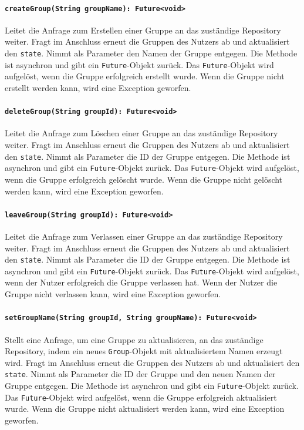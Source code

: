 \documentclass{entwurfsheft}
\begin{document}
\begin{sloppypar}
\paragraph{\texttt{createGroup(String groupName): Future<void>}}
Leitet die Anfrage zum Erstellen einer Gruppe an das zuständige Repository weiter. Fragt im Anschluss erneut die Gruppen des Nutzers ab und aktualisiert den \texttt{state}. Nimmt als Parameter den Namen der Gruppe entgegen. Die Methode ist asynchron und gibt ein \texttt{Future}-Objekt zurück. Das \texttt{Future}-Objekt wird aufgelöst, wenn die Gruppe erfolgreich erstellt wurde. Wenn die Gruppe nicht erstellt werden kann, wird eine Exception geworfen.
\paragraph{\texttt{deleteGroup(String groupId): Future<void>}}
Leitet die Anfrage zum Löschen einer Gruppe an das zuständige Repository weiter. Fragt im Anschluss erneut die Gruppen des Nutzers ab und aktualisiert den \texttt{state}. Nimmt als Parameter die ID der Gruppe entgegen. Die Methode ist asynchron und gibt ein \texttt{Future}-Objekt zurück. Das \texttt{Future}-Objekt wird aufgelöst, wenn die Gruppe erfolgreich gelöscht wurde. Wenn die Gruppe nicht gelöscht werden kann, wird eine Exception geworfen.
\paragraph{\texttt{leaveGroup(String groupId): Future<void>}}
Leitet die Anfrage zum Verlassen einer Gruppe an das zuständige Repository weiter. Fragt im Anschluss erneut die Gruppen des Nutzers ab und aktualisiert den \texttt{state}. Nimmt als Parameter die ID der Gruppe entgegen. Die Methode ist asynchron und gibt ein \texttt{Future}-Objekt zurück. Das \texttt{Future}-Objekt wird aufgelöst, wenn der Nutzer erfolgreich die Gruppe verlassen hat. Wenn der Nutzer die Gruppe nicht verlassen kann, wird eine Exception geworfen.
\paragraph{\texttt{setGroupName(String groupId, String groupName): Future<void>}}
Stellt eine Anfrage, um eine Gruppe zu aktualisieren, an das zuständige Repository, indem ein neues \texttt{Group}-Objekt mit aktualisiertem Namen erzeugt wird. Fragt im Anschluss erneut die Gruppen des Nutzers ab und aktualisiert den \texttt{state}. Nimmt als Parameter die ID der Gruppe und den neuen Namen der Gruppe entgegen. Die Methode ist asynchron und gibt ein \texttt{Future}-Objekt zurück. Das \texttt{Future}-Objekt wird aufgelöst, wenn die Gruppe erfolgreich aktualisiert wurde. Wenn die Gruppe nicht aktualisiert werden kann, wird eine Exception geworfen.

\end{sloppypar}
\end{document}
